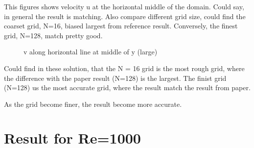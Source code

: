 \documentclass[12pt]{article}
\begin{document}
This figures shows velocity u at the horizontal middle of the domain. Could say, in general the result is matching. Also compare different grid size, could find the coarset grid, N=16, biased largest from reference result. Conversely, the finest grid, N=128, match pretty good.


\begin{figure}[H]
    \centering
    \caption{v along horizontal line at middle of y (large)}
\end{figure}


Could find in these solution, that the N = 16 grid is the most rough grid, where the difference with the paper result (N=128) is the largest.
The finist grid (N=128) us the most accurate grid, where the result match the result from paper.  

As the grid become finer, the result become more accurate.























\section{Result for Re=1000}
\end{document}
